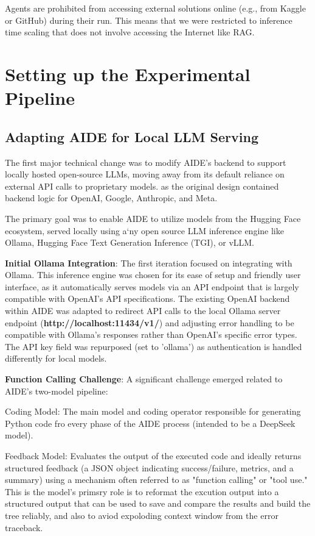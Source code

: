 Agents are prohibited from accessing external solutions online (e.g., from Kaggle or GitHub) during their run. This means that we were restricted to inference time scaling that does not involve accessing the Internet like RAG.
\section{Setting up the Experimental Pipeline}

\subsection{Adapting AIDE for Local LLM Serving}

The first major technical change was to modify AIDE's backend to support locally hosted open-source LLMs, moving away from its default reliance on external API calls to proprietary models. as the original design contained backend logic for OpenAI, Google, Anthropic, and Meta.

The primary goal was to enable AIDE to utilize models from the Hugging Face ecosystem, served locally using a`ny open source LLM inference engine like Ollama, Hugging Face Text Generation Inference (TGI), or vLLM.

\textbf{Initial Ollama Integration}: The first iteration focused on integrating with Ollama. This inference engine was chosen for its ease of setup and friendly user interface, as it automatically serves models via an API endpoint that is largely compatible with OpenAI's API specifications. The existing OpenAI backend within AIDE was adapted to redirect API calls to the local Ollama server endpoint (\textbf{http://localhost:11434/v1/}) and adjusting error handling to be compatible with Ollama's responses rather than OpenAI's specific error types. The API key field was repurposed (set to 'ollama') as authentication is handled differently for local models.

\textbf{Function Calling Challenge}: A significant challenge emerged related to AIDE's two-model pipeline:

Coding Model: The main model and coding operator responsible for generating Python code fro every phase of the AIDE process (intended to be a DeepSeek model).

Feedback Model: Evaluates the output of the executed code and ideally returns structured feedback (a JSON object indicating success/failure, metrics, and a summary) using a mechanism often referred to as "function calling" or "tool use." This is the model's primsry role is to reformat the excution output into a structured output that can be used to save and compare the results and build the tree reliably, and also to aviod expoloding context window from the error traceback.

